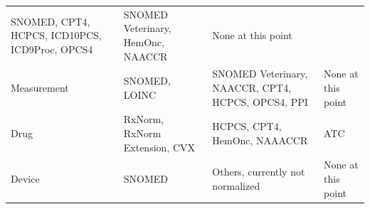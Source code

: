 \documentclass[11pt]{book}
\theoremstyle{definition}
\theoremstyle{definition}
\theoremstyle{definition}
\theoremstyle{remark}
\begin{document}
\begin{longtable}[]{@{}llll@{}}
\begin{minipage}[t]{0.21\columnwidth}
SNOMED, CPT4, HCPCS, ICD10PCS, ICD9Proc, OPCS4\strut
\end{minipage} & \begin{minipage}[t]{0.21\columnwidth}\raggedright\strut
SNOMED Veterinary, HemOnc, NAACCR\strut
\end{minipage} & \begin{minipage}[t]{0.18\columnwidth}\raggedright\strut
None at this point\strut
\end{minipage}\tabularnewline
\begin{minipage}[t]{0.12\columnwidth}\raggedright\strut
Measurement\strut
\end{minipage} & \begin{minipage}[t]{0.21\columnwidth}\raggedright\strut
SNOMED, LOINC\strut
\end{minipage} & \begin{minipage}[t]{0.21\columnwidth}\raggedright\strut
SNOMED Veterinary, NAACCR, CPT4, HCPCS, OPCS4, PPI\strut
\end{minipage} & \begin{minipage}[t]{0.18\columnwidth}\raggedright\strut
None at this point\strut
\end{minipage}\tabularnewline
\begin{minipage}[t]{0.12\columnwidth}\raggedright\strut
Drug\strut
\end{minipage} & \begin{minipage}[t]{0.21\columnwidth}\raggedright\strut
RxNorm, RxNorm Extension, CVX\strut
\end{minipage} & \begin{minipage}[t]{0.21\columnwidth}\raggedright\strut
HCPCS, CPT4, HemOnc, NAAACCR\strut
\end{minipage} & \begin{minipage}[t]{0.18\columnwidth}\raggedright\strut
ATC\strut
\end{minipage}\tabularnewline
\begin{minipage}[t]{0.12\columnwidth}\raggedright\strut
Device\strut
\end{minipage} & \begin{minipage}[t]{0.21\columnwidth}\raggedright\strut
SNOMED\strut
\end{minipage} & \begin{minipage}[t]{0.21\columnwidth}\raggedright\strut
Others, currently not normalized\strut
\end{minipage} & \begin{minipage}[t]{0.18\columnwidth}\raggedright\strut
None at this point\strut

\end{minipage}
\end{longtable}
\end{document}
